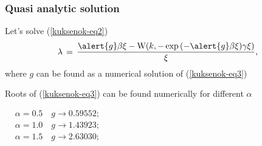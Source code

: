 \documentclass[fullscreen=true, unicode, bookmarks=false]{beamer}
\begin{document}
\begin{frame}
\frametitle{Quasi analytic solution}
Let's solve (\ref{kuksenok-eq2})
\begin{equation}\label{kuksenok-eq4}
\lambda \, = \, \frac{\alert{g} \beta \xi - \text{W}(k,-\exp{(-\alert{g} \beta \xi) \gamma \xi})}{\xi},
\end{equation}
where $g$ can be found as a numerical solution of (\ref{kuksenok-eq3})
\end{frame}
\begin{frame}
Roots of (\ref{kuksenok-eq3}) can be found numerically for different $\alpha $
\begin{center}$
\begin{aligned}
&\alpha = 0.5 \quad g \rightarrow  0.59552; \\
&\alpha = 1.0 \quad g \rightarrow 1.43923; \\
&\alpha = 1.5 \quad g \rightarrow  2.63030; \end{aligned}$ 
\end{center}
\end{frame}
\end{document}
